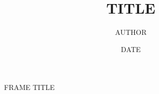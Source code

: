 \documentclass[10pt]{beamer}
\title{TITLE}
\date{DATE}
\author{AUTHOR}
\institute{POSITON \\ AFFILIATION}
\makeatletter
\def\blfootnote{\gdef\@thefnmark{}\@footnotetext}
\newcommand{\pdfnote}[1]{\marginnote{\pdfcomment[icon=note]{#1}}}
\makeatother
\begin{document}
\maketitle

\begin{frame}{FRAME TITLE}

\end{frame}
\end{document}
